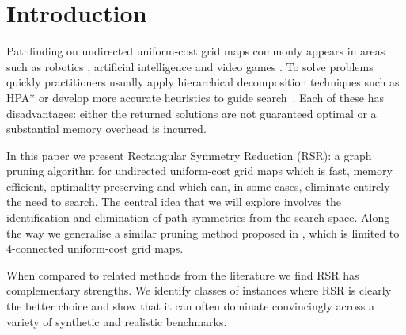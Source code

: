 \section{Introduction}
\label{sec:introduction}
Pathfinding on undirected uniform-cost grid maps commonly appears in 
areas such as robotics \cite{lee09},
artificial intelligence \cite{wang09} and video games \cite{davis00,sturtevant10}.  
To solve problems quickly practitioners usually apply
hierarchical decomposition techniques such as HPA* \cite{botea04,sturtevant10} or 
develop more accurate heuristics to guide search~\cite{bjornsson06,sturtevant09,goldenberg10}.  
Each of these has disadvantages: either the returned solutions are
not guaranteed optimal or a substantial memory overhead is incurred.
\par
In this paper we present Rectangular Symmetry Reduction (RSR): a graph pruning
algorithm for undirected uniform-cost grid maps which is fast, memory efficient,
optimality preserving and which can, in some cases, eliminate entirely the need
to search.  
The central idea that we will explore involves the identification
and elimination of path symmetries from the search space. 
Along the way we generalise a similar pruning method proposed in \cite{harabor10},
which is limited to 4-connected uniform-cost grid maps.
\par
When compared to related methods from the literature we
find RSR has complementary strengths. We identify classes of instances
where RSR is clearly the better choice and show that it can often dominate convincingly
across a variety of synthetic and realistic benchmarks.

